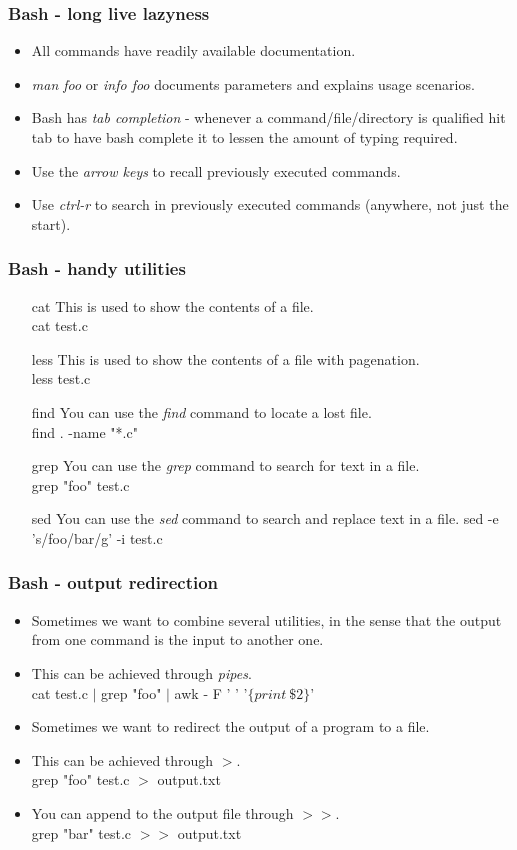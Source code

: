\documentclass{beamer}
\begin{document}
\begin{frame}\frametitle{Bash - long live lazyness}
  \begin{itemize}
    \item All commands have readily available documentation.
    \item \emph{man foo} or \emph{info foo} documents parameters and explains usage scenarios.
    \item Bash has \emph{tab completion} - whenever a command/file/directory is qualified hit tab to 
          have bash complete it to lessen the amount of typing required.
    \item Use the \emph{arrow keys} to recall previously executed commands.
    \item Use \emph{ctrl-r} to search in previously executed commands (anywhere, not just the start).
  \end{itemize}
\end{frame}

\begin{frame}\frametitle{Bash - handy utilities}
  \begin{itemize}
    \item[cat] This is used to show the contents of a file. \\
      cat test.c
    \item[less] This is used to show the contents of a file with pagenation. \\
      less test.c
    \item[find] You can use the \emph{find} command to locate a lost file. \\
      find . -name "*.c"
    \item[grep] You can use the \emph{grep} command to search for text in a file. \\
      grep "foo" test.c
    \item[sed] You can use the \emph{sed} command to search and replace text in a file.
      sed -e 's/foo/bar/g' -i test.c
  \end{itemize}
\end{frame}

\begin{frame}\frametitle{Bash - output redirection}
  \begin{itemize}
    \item Sometimes we want to combine several utilities, in the sense that the output from
          one command is the input to another one.
    \item This can be achieved through \emph{pipes}. \\
          cat test.c $\vert$ grep "foo" $\vert$ awk - F ' ' '$\{print\ \$2\}$'
    \item Sometimes we want to redirect the output of a program to a file.
    \item This can be achieved through $>$. \\
        grep "foo" test.c $>$ output.txt
    \item You can append to the output file through $>>$. \\
        grep "bar" test.c $>>$ output.txt
  \end{itemize}
\end{frame}
\end{document}
